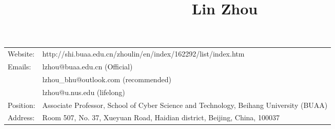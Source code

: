 \documentclass[12pt]{article} %
\begin{document}

\title{Lin Zhou} %


\parbox{0.5\textwidth}{ %
\begin{tabular}{lp{13cm}}
Website:&http://shi.buaa.edu.cn/zhoulin/en/index/162292/list/index.htm\\
Emails: & lzhou@buaa.edu.cn (Official)\\
&lzhou\_bhu@outlook.com (recommended)\\
&lzhou@u.nus.edu (lifelong) \\
Position: & Associate Professor, School of Cyber Science and Technology, Beihang University (BUAA)\\
Address: & Room 507, No. 37, Xueyuan Road, Haidian district, Beijing, China, 100037\\
\end{tabular}}
\end{document}
